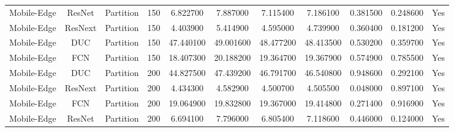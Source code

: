 \begin{tabular}{|c||c||c||c||c||c||c||c||c||c||c|}
Mobile-Edge & ResNet & Partition & 150 & 6.822700 & 7.887000 & 7.115400 & 7.186100 & 0.381500 & 0.248600 & Yes \\
Mobile-Edge & ResNext & Partition & 150 & 4.403900 & 5.414900 & 4.595000 & 4.739900 & 0.360400 & 0.181200 & Yes \\
Mobile-Edge & DUC & Partition & 150 & 47.440100 & 49.001600 & 48.477200 & 48.413500 & 0.530200 & 0.359700 & Yes \\
Mobile-Edge & FCN & Partition & 150 & 18.407300 & 20.188200 & 19.364700 & 19.367900 & 0.574900 & 0.785500 & Yes \\
Mobile-Edge & DUC & Partition & 200 & 44.827500 & 47.439200 & 46.791700 & 46.540800 & 0.948600 & 0.292100 & Yes \\
Mobile-Edge & ResNext & Partition & 200 & 4.434300 & 4.582900 & 4.500700 & 4.505500 & 0.048000 & 0.897100 & Yes \\
Mobile-Edge & FCN & Partition & 200 & 19.064900 & 19.832800 & 19.367000 & 19.414800 & 0.271400 & 0.916900 & Yes \\
Mobile-Edge & ResNet & Partition & 200 & 6.694100 & 7.796000 & 6.805400 & 7.118600 & 0.446000 & 0.124000 & Yes \\
\bottomrule
\end{tabular}
